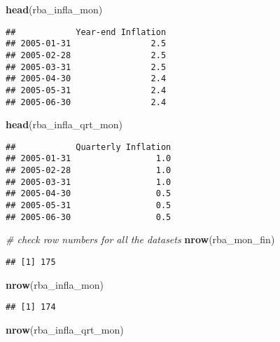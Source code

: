 \documentclass[]{article}
\newenvironment{Shaded}{\begin{snugshade}}{\end{snugshade}}
\newcommand{\KeywordTok}[1]{\textcolor[rgb]{0.13,0.29,0.53}{\textbf{#1}}}
\newcommand{\CommentTok}[1]{\textcolor[rgb]{0.56,0.35,0.01}{\textit{#1}}}
\newcommand{\NormalTok}[1]{#1}
\begin{document}
\begin{Shaded}
\begin{Highlighting}[]
    \KeywordTok{head}\NormalTok{(rba_infla_mon)}
\end{Highlighting}
\end{Shaded}

\begin{verbatim}
##            Year-end Inflation
## 2005-01-31                2.5
## 2005-02-28                2.5
## 2005-03-31                2.5
## 2005-04-30                2.4
## 2005-05-31                2.4
## 2005-06-30                2.4
\end{verbatim}

\begin{Shaded}
\begin{Highlighting}[]
    \KeywordTok{head}\NormalTok{(rba_infla_qrt_mon)}
\end{Highlighting}
\end{Shaded}

\begin{verbatim}
##            Quarterly Inflation
## 2005-01-31                 1.0
## 2005-02-28                 1.0
## 2005-03-31                 1.0
## 2005-04-30                 0.5
## 2005-05-31                 0.5
## 2005-06-30                 0.5
\end{verbatim}

\begin{Shaded}
\begin{Highlighting}[]
    \CommentTok{# check row numbers for all the datasets}
    \KeywordTok{nrow}\NormalTok{(rba_mon_fin)}
\end{Highlighting}
\end{Shaded}

\begin{verbatim}
## [1] 175
\end{verbatim}

\begin{Shaded}
\begin{Highlighting}[]
    \KeywordTok{nrow}\NormalTok{(rba_infla_mon)}
\end{Highlighting}
\end{Shaded}

\begin{verbatim}
## [1] 174
\end{verbatim}

\begin{Shaded}
\begin{Highlighting}[]
    \KeywordTok{nrow}\NormalTok{(rba_infla_qrt_mon)}
\end{Highlighting}
\end{Shaded}
\end{document}
